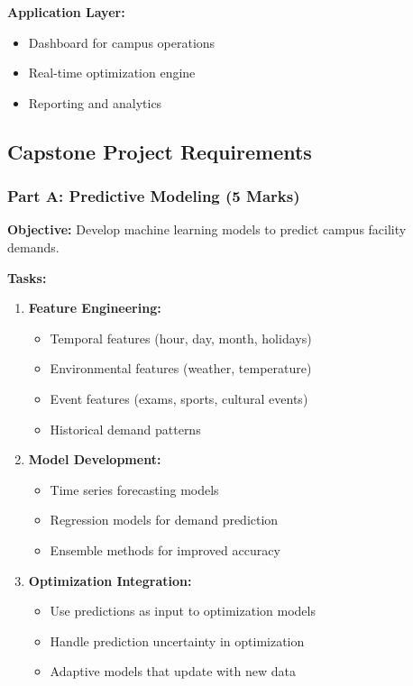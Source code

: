 \documentclass[
  letterpaper,
  DIV=11,
  numbers=noendperiod]{scrreprt}
\providecommand{\tightlist}{%
  \setlength{\itemsep}{0pt}\setlength{\parskip}{0pt}}
\begin{document}
\textbf{Application Layer:}

\begin{itemize}
\tightlist
\item
  Dashboard for campus operations
\item
  Real-time optimization engine
\item
  Reporting and analytics
\end{itemize}

\subsection{Capstone Project
Requirements}\label{capstone-project-requirements}

\subsubsection{Part A: Predictive Modeling (5
Marks)}\label{part-a-predictive-modeling-5-marks}

\textbf{Objective:} Develop machine learning models to predict campus
facility demands.

\textbf{Tasks:}

\begin{enumerate}
\def\labelenumi{\arabic{enumi}.}
\item
  \textbf{Feature Engineering:}

  \begin{itemize}
  \tightlist
  \item
    Temporal features (hour, day, month, holidays)
  \item
    Environmental features (weather, temperature)
  \item
    Event features (exams, sports, cultural events)
  \item
    Historical demand patterns
  \end{itemize}
\item
  \textbf{Model Development:}

  \begin{itemize}
  \tightlist
  \item
    Time series forecasting models
  \item
    Regression models for demand prediction
  \item
    Ensemble methods for improved accuracy
  \end{itemize}
\item
  \textbf{Optimization Integration:}

  \begin{itemize}
  \tightlist
  \item
    Use predictions as input to optimization models
  \item
    Handle prediction uncertainty in optimization
  \item
    Adaptive models that update with new data
  \end{itemize}
\end{enumerate}
\end{document}
